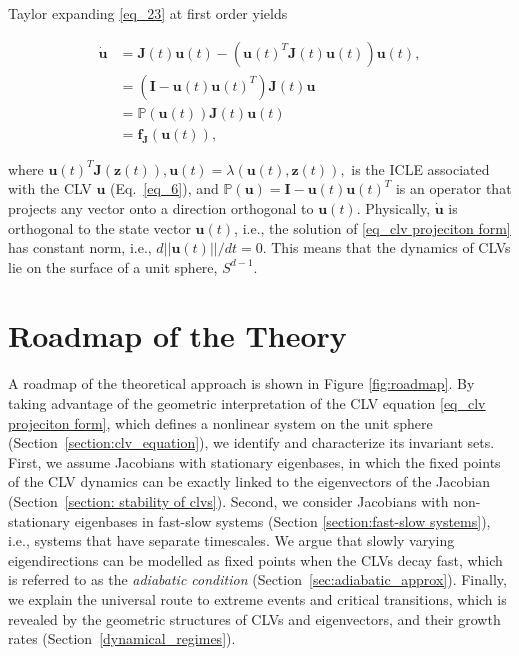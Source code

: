 \documentclass[aps,reprint,prx]{revtex4-2}
\begin{document}
Taylor expanding \eqref{eq_23} at first order yields

\begin{align} \label{eq_clv projeciton form}
\dot{{\mathbf{u}}} &= \mathbf{J}(t){\mathbf{u}}(t) - \left({{\mathbf{u}}(t)^T \mathbf{J}(t){\mathbf{u}}(t)}\right){\mathbf{u}}(t), \nonumber \\ 
& = \left( \mathbf{I} - \mathbf{u}(t)\mathbf{u}(t)^T \right)\mathbf{J}(t)\mathbf{u} \nonumber \\ 
& = \mathbb{P}(\mathbf{u}(t))\mathbf{J}(t)\mathbf{u}(t) \nonumber \\ 
&=\mathbf{f}_\mathbf{J}(\mathbf{u}(t)),
\end{align}

where
$ \mathbf{u}(t)^T \mathbf{J}(\mathbf{z}(t)), \mathbf{u}(t)
= \lambda(\mathbf{u}(t), \mathbf{z}(t)),
$ is the ICLE associated with the CLV $\mathbf{u}$ (Eq.~\ref{eq_6}), and
$\mathbb{P}({\mathbf{u}}) = \mathbf{I} - {\mathbf{u}(t)}{\mathbf{u}(t)}^T$ is an operator that projects any vector onto a direction orthogonal to ${\mathbf{u}(t)}$. Physically, $\dot{{\mathbf{u}}}$ is orthogonal to the state vector ${\mathbf{u}(t)}$, i.e., the solution of \eqref{eq_clv projeciton form} has constant norm, i.e., ${d}||{\mathbf{u}(t)}||/{dt} = 0$.
This means that the dynamics of CLVs lie on the surface of a unit sphere, $S^{d-1}$.



\section{Roadmap of the Theory}\label{sec:theory_roadmap}
A roadmap of the theoretical approach is shown in Figure \ref{fig:roadmap}.
By taking advantage of the geometric interpretation of the CLV equation \eqref{eq_clv projeciton form}, which defines a nonlinear system on the unit sphere (Section~\ref{section:clv_equation}), we identify and characterize its invariant sets. First, we assume Jacobians with stationary eigenbases, in which the fixed points of the CLV dynamics can be exactly linked to the eigenvectors of the Jacobian (Section~\ref{section: stability of clvs}). Second, we consider Jacobians with non-stationary eigenbases in fast-slow systems (Section \ref{section:fast-slow systems}), i.e., systems that have separate timescales. We argue that slowly varying eigendirections can be modelled as fixed points when the CLVs decay fast, which is referred to as the {\it adiabatic condition} (Section~\ref{sec:adiabatic_approx}). Finally, we explain the universal route to extreme events and critical transitions, which is revealed by the geometric structures of CLVs and eigenvectors, and their growth rates (Section~\ref{dynamical_regimes}).
\end{document}
